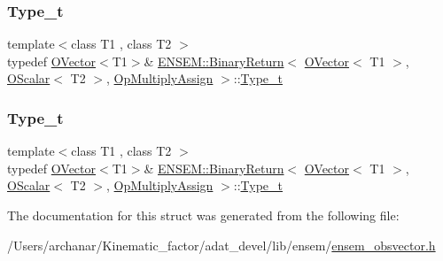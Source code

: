 \subsubsection{\texorpdfstring{Type\_t}{Type\_t}\hspace{0.1cm}{\footnotesize\ttfamily [1/2]}}
{\footnotesize\ttfamily template$<$class T1 , class T2 $>$ \\
typedef \mbox{\hyperlink{classENSEM_1_1OVector}{O\+Vector}}$<$T1$>$\& \mbox{\hyperlink{structENSEM_1_1BinaryReturn}{E\+N\+S\+E\+M\+::\+Binary\+Return}}$<$ \mbox{\hyperlink{classENSEM_1_1OVector}{O\+Vector}}$<$ T1 $>$, \mbox{\hyperlink{classENSEM_1_1OScalar}{O\+Scalar}}$<$ T2 $>$, \mbox{\hyperlink{structENSEM_1_1OpMultiplyAssign}{Op\+Multiply\+Assign}} $>$\+::\mbox{\hyperlink{structENSEM_1_1BinaryReturn_3_01OVector_3_01T1_01_4_00_01OScalar_3_01T2_01_4_00_01OpMultiplyAssign_01_4_ae9e6b3f41826781c1bb6c57960320674}{Type\+\_\+t}}}

\mbox{\label{structENSEM_1_1BinaryReturn_3_01OVector_3_01T1_01_4_00_01OScalar_3_01T2_01_4_00_01OpMultiplyAssign_01_4_ae9e6b3f41826781c1bb6c57960320674}} 
\subsubsection{\texorpdfstring{Type\_t}{Type\_t}\hspace{0.1cm}{\footnotesize\ttfamily [2/2]}}
{\footnotesize\ttfamily template$<$class T1 , class T2 $>$ \\
typedef \mbox{\hyperlink{classENSEM_1_1OVector}{O\+Vector}}$<$T1$>$\& \mbox{\hyperlink{structENSEM_1_1BinaryReturn}{E\+N\+S\+E\+M\+::\+Binary\+Return}}$<$ \mbox{\hyperlink{classENSEM_1_1OVector}{O\+Vector}}$<$ T1 $>$, \mbox{\hyperlink{classENSEM_1_1OScalar}{O\+Scalar}}$<$ T2 $>$, \mbox{\hyperlink{structENSEM_1_1OpMultiplyAssign}{Op\+Multiply\+Assign}} $>$\+::\mbox{\hyperlink{structENSEM_1_1BinaryReturn_3_01OVector_3_01T1_01_4_00_01OScalar_3_01T2_01_4_00_01OpMultiplyAssign_01_4_ae9e6b3f41826781c1bb6c57960320674}{Type\+\_\+t}}}



The documentation for this struct was generated from the following file\+:\begin{DoxyCompactItemize}
\item 
/\+Users/archanar/\+Kinematic\+\_\+factor/adat\+\_\+devel/lib/ensem/\mbox{\hyperlink{lib_2ensem_2ensem__obsvector_8h}{ensem\+\_\+obsvector.\+h}}\end{DoxyCompactItemize}
